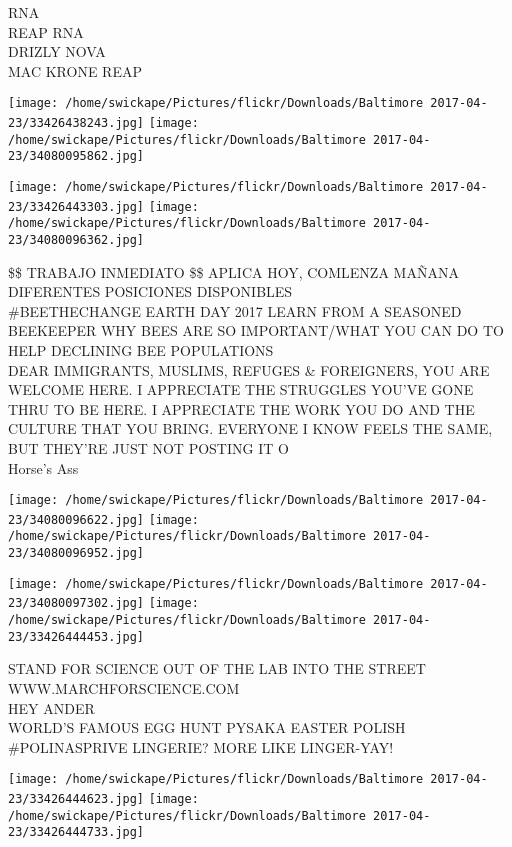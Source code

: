 \documentclass[10pt,letterpaper]{article}
\begin{document}
RNA\\
REAP RNA\\
DRIZLY NOVA\\
MAC KRONE REAP\\
\pagebreak

\texttt{[image: /home/swickape/Pictures/flickr/Downloads/Baltimore 2017-04-23/33426438243.jpg]}
\texttt{[image: /home/swickape/Pictures/flickr/Downloads/Baltimore 2017-04-23/34080095862.jpg]}

\texttt{[image: /home/swickape/Pictures/flickr/Downloads/Baltimore 2017-04-23/33426443303.jpg]}
\texttt{[image: /home/swickape/Pictures/flickr/Downloads/Baltimore 2017-04-23/34080096362.jpg]}

\$\$ TRABAJO INMEDIATO \$\$ APLICA HOY, COMLENZA MAÑANA DIFERENTES POSICIONES DISPONIBLES\\
\#BEETHECHANGE EARTH DAY 2017 LEARN FROM A SEASONED BEEKEEPER WHY BEES ARE SO IMPORTANT/WHAT YOU CAN DO TO HELP DECLINING BEE POPULATIONS\\
DEAR IMMIGRANTS, MUSLIMS, REFUGES \& FOREIGNERS, YOU ARE WELCOME HERE.  I APPRECIATE THE STRUGGLES YOU'VE GONE THRU TO BE HERE.  I APPRECIATE THE WORK YOU DO AND THE CULTURE THAT YOU BRING.  EVERYONE I KNOW FEELS THE SAME, BUT THEY'RE JUST NOT POSTING IT O\\
Horse's Ass\\
\pagebreak

\texttt{[image: /home/swickape/Pictures/flickr/Downloads/Baltimore 2017-04-23/34080096622.jpg]}
\texttt{[image: /home/swickape/Pictures/flickr/Downloads/Baltimore 2017-04-23/34080096952.jpg]}

\texttt{[image: /home/swickape/Pictures/flickr/Downloads/Baltimore 2017-04-23/34080097302.jpg]}
\texttt{[image: /home/swickape/Pictures/flickr/Downloads/Baltimore 2017-04-23/33426444453.jpg]}

STAND FOR SCIENCE OUT OF THE LAB INTO THE STREET WWW.MARCHFORSCIENCE.COM\\
HEY ANDER\\
WORLD'S FAMOUS EGG HUNT PYSAKA EASTER POLISH\\
\#POLINASPRIVE LINGERIE? MORE LIKE LINGER{-}YAY!\\
\pagebreak

\texttt{[image: /home/swickape/Pictures/flickr/Downloads/Baltimore 2017-04-23/33426444623.jpg]}
\texttt{[image: /home/swickape/Pictures/flickr/Downloads/Baltimore 2017-04-23/33426444733.jpg]}
\end{document}
